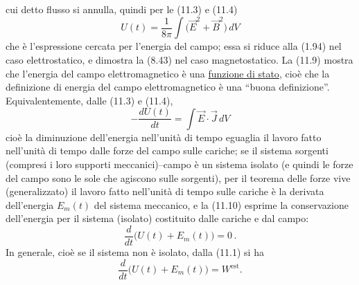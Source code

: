 cui detto flusso si annulla, quindi per le (11.3) e (11.4)
\begin{equation}
  U(t)=\frac{1}{8\pi}\int\big(\vec E^2+\vec B^2\big)\,dV
  \tag{11.9}
\end{equation}
che \`e l'espressione cercata per l'energia del campo; essa si riduce alla
(1.94) nel caso elettrostatico, e dimostra la (8.43) nel caso magnetostatico. La
(11.9) mostra che l'energia del campo elettromagnetico \`e una
\underline{funzione di stato}, cio\`e che la definizione di energia del campo
elettromagnetico \`e una ``buona definizione''.\\
Equivalentemente, dalle (11.3) e (11.4),
\begin{equation}
  -\frac{dU(t)}{dt}=\int\vec E\cdot\vec J\,dV
  \tag{11.10}
\end{equation}
cio\`e la diminuzione dell'energia nell'unit\`a di tempo eguaglia il lavoro
fatto nell'unit\`a di tempo dalle forze del campo sulle cariche; se il sistema
sorgenti (compresi i loro supporti meccanici)--campo \`e un sistema isolato (e
quindi le forze del campo sono le sole che agiscono sulle sorgenti), per il
teorema delle forze vive (generalizzato) il lavoro fatto nell'unit\`a di tempo
sulle cariche \`e la derivata dell'energia $E_m(t)$ del sistema meccanico, e la
(11.10) esprime la conservazione dell'energia per il sistema (isolato)
costituito dalle cariche e dal campo:
\begin{equation}
  \frac{d}{dt}\Big(U(t)+E_m(t)\Big)=0\,.
  \tag{11.11}
\end{equation}
In generale, cio\`e se il sistema non \`e isolato, dalla (11.1) si ha
\begin{equation}
  \frac{d}{dt}\Big(U(t)+E_m(t)\Big)=W^\mathrm{est}.
  \tag{11.12}
\end{equation}

